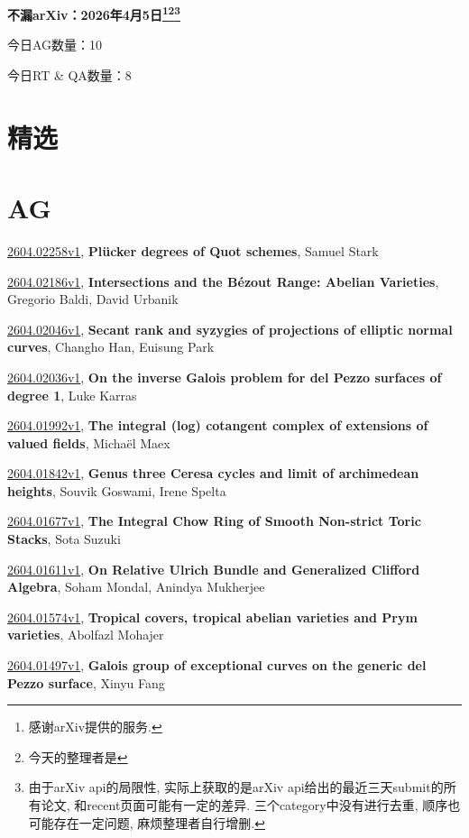 \documentclass[9pt, a4paper]{article}
\theoremstyle{plain}
\theoremstyle{definition}
\theoremstyle{remark}
\newcommand{\arxiv}[3]{\href{https://arxiv.org/abs/#1}{#1}, \textbf{\textcolor{arxivblue}{#2}}, #3}
\newcommand{\AGnumber}{10}
\newcommand{\RTQAnumber}{8}
\newcommand{\NewestDate}{2026年4月5日}
\newcommand{\todayarXiver}{} %
\begin{document}
\begin{center}
    \Huge\textbf{不漏arXiv：\NewestDate\footnote{感谢arXiv提供的服务.}\footnote{今天的整理者是\todayarXiver}\footnote{由于arXiv api的局限性, 实际上获取的是arXiv api给出的最近三天submit的所有论文, 和recent页面可能有一定的差异. 三个category中没有进行去重, 顺序也可能存在一定问题, 麻烦整理者自行增删.}} \\
\end{center}

\setcounter{section}{-1}

\begin{center}
    今日AG数量：\AGnumber
    
    今日RT \& QA数量：\RTQAnumber
    
\end{center}


\section{精选}


\section{AG}
\arxiv{2604.02258v1}{Plücker degrees of Quot schemes}{Samuel Stark}

\arxiv{2604.02186v1}{Intersections and the Bézout Range: Abelian Varieties}{Gregorio Baldi, David Urbanik}

\arxiv{2604.02046v1}{Secant rank and syzygies of projections of elliptic normal curves}{Changho Han, Euisung Park}

\arxiv{2604.02036v1}{On the inverse Galois problem for del Pezzo surfaces of degree 1}{Luke Karras}

\arxiv{2604.01992v1}{The integral (log) cotangent complex of extensions of valued fields}{Michaël Maex}

\arxiv{2604.01842v1}{Genus three Ceresa cycles and limit of archimedean heights}{Souvik Goswami, Irene Spelta}

\arxiv{2604.01677v1}{The Integral Chow Ring of Smooth Non-strict Toric Stacks}{Sota Suzuki}

\arxiv{2604.01611v1}{On Relative Ulrich Bundle and Generalized Clifford Algebra}{Soham Mondal, Anindya Mukherjee}

\arxiv{2604.01574v1}{Tropical covers, tropical abelian varieties and Prym varieties}{Abolfazl Mohajer}

\arxiv{2604.01497v1}{Galois group of exceptional curves on the generic del Pezzo surface}{Xinyu Fang}
\end{document}
